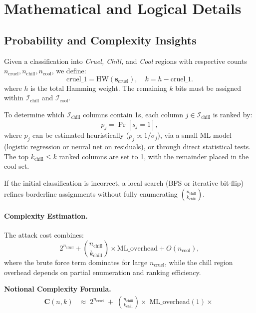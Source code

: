 \documentclass[conference]{IEEEtran}
\begin{document}
\section{Mathematical and Logical Details}
\label{sec:math-logic}

\subsection{Probability and Complexity Insights}
\label{subsec:prob-comb}

Given a classification into \emph{Cruel, Chill,} and \emph{Cool} regions with respective counts $n_{\mathrm{cruel}}, n_{\mathrm{chill}}, n_{\mathrm{cool}}$, we define:
\[
  \mathrm{cruel\_1} = \mathrm{HW}(\mathbf{s}_{\mathrm{cruel}}), \quad 
  k = h - \mathrm{cruel\_1}.
\]
where $h$ is the total Hamming weight. The remaining $k$ bits must be assigned within $\mathcal{I}_{\mathrm{chill}}$ and $\mathcal{I}_{\mathrm{cool}}$.

To determine which $\mathcal{I}_{\mathrm{chill}}$ columns contain 1s, each column $j \in \mathcal{I}_{\mathrm{chill}}$ is ranked by:
\[
  p_j = \Pr[s_j = 1],
\]
where $p_j$ can be estimated heuristically ($p_j \propto 1/\sigma_j$), via a small ML model (logistic regression or neural net on residuals), or through direct statistical tests. The top $k_{\mathrm{chill}} \leq k$ ranked columns are set to 1, with the remainder placed in the cool set.

If the initial classification is incorrect, a local search (BFS or iterative bit-flip) refines borderline assignments without fully enumerating $\binom{n_{\mathrm{chill}}}{k_{\mathrm{chill}}}$. 

\paragraph{Complexity Estimation.}  
The attack cost combines:
\[
  2^{n_{\mathrm{cruel}}} + \binom{n_{\mathrm{chill}}}{k_{\mathrm{chill}}} \times \text{ML\_overhead} + O(n_{\mathrm{cool}}),
\]
where the brute force term dominates for large $n_{\mathrm{cruel}}$, while the chill region overhead depends on partial enumeration and ranking efficiency.

\vspace{1em}
\noindent\textbf{Notional Complexity Formula.}
\begin{align*}
\mathbf{C}(n, k)
  &\approx\; 
  2^{n_{\mathrm{cruel}}} 
  \;+\;
  \binom{\textstyle n_{\mathrm{chill}}}{\textstyle k_{\mathrm{chill}}}
  \times\; \mathrm{ML\_overhead}(1) 
  \times\;
\end{align*}
\end{document}
